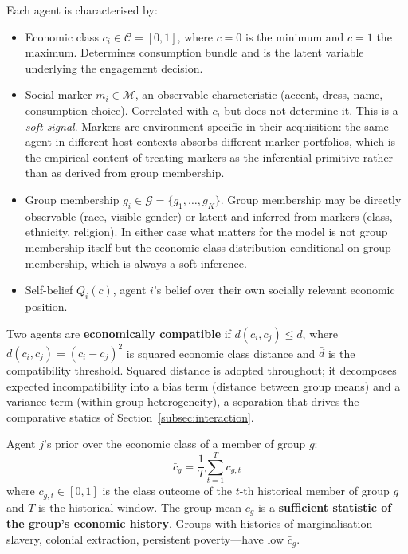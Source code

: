 \documentclass[12pt,a4paper]{article}
\theoremstyle{definition}
\numberwithin{proposition}{subsection}
\newcommand{\G}{\mathcal{G}}
\newcommand{\M}{\mathcal{M}}
\newcommand{\C}{\mathcal{C}}
\begin{document}
Each agent is characterised by:
\begin{itemize}[noitemsep]
  \item Economic class $c_i \in \C = [0,1]$, where $c = 0$ is the
  minimum and $c = 1$ the maximum. Determines consumption bundle and
  is the latent variable underlying the engagement decision.
  \item Social marker $m_i \in \M$, an observable characteristic
  (accent, dress, name, consumption choice). Correlated with $c_i$
  but does not determine it. This is a \emph{soft signal}. Markers
  are environment-specific in their acquisition: the same agent in
  different host contexts absorbs different marker portfolios, which
  is the empirical content of treating markers as the inferential
  primitive rather than as derived from group membership.
  \item Group membership $g_i \in \G = \{g_1, \ldots, g_K\}$.
  Group membership may be directly observable (race, visible gender)
  or latent and inferred from markers (class, ethnicity, religion).
  In either case what matters for the model is not group membership
  itself but the economic class distribution conditional on group
  membership, which is always a soft inference.
  \item Self-belief $Q_i(c)$, agent $i$'s belief over their own
  socially relevant economic position.
\end{itemize}

Two agents are \textbf{economically compatible} if
$d(c_i, c_j) \leq \bar{d}$, where $d(c_i, c_j) = (c_i - c_j)^2$ is
squared economic class distance and $\bar{d}$ is the compatibility threshold.
Squared distance is adopted throughout; it decomposes expected
incompatibility into a bias term (distance between group means) and
a variance term (within-group heterogeneity), a separation that drives
the comparative statics of Section~\ref{subsec:interaction}.

Agent $j$'s prior over the economic class of a member of group $g$:
\begin{equation}
  \bar{c}_g = \frac{1}{T} \sum_{t=1}^{T} c_{g,t}
  \label{eq:prior}
\end{equation}
where $c_{g,t} \in [0,1]$ is the class outcome of the $t$-th
historical member of group $g$ and $T$ is the historical window.
The group mean $\bar{c}_g$ is a \textbf{sufficient
statistic of the group's economic history}. Groups with histories of
marginalisation---slavery, colonial extraction, persistent
poverty---have low $\bar{c}_g$.
\end{document}
